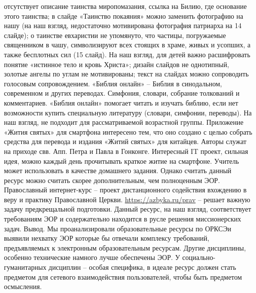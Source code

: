 отсутствует описание таинства миропомазания, ссылка на Билию, где основание этого таинства;
в слайде «Таинство покаяния» можно заменить фотографию на нашу (на наш взгляд, недостаточно мотивирована фотография патриарха на 14 слайде);
о таинстве евхаристии не упомянуто, что частицы, погружаемые священником в чашу, символизируют всех стоящих в храме, живых и усопших, а также бесплотных сил (15 слайд). На наш взгляд, для детей важно расшифровать понятие «истинное тело и кровь Христа»;
дизайн слайдов не однотипный, золотые ангелы по углам не мотивированы;
текст на слайдах можно сопроводить голосовым сопровождением.
«Библия онлайн» – Библия в синодальном, современном и других переводах. Симфония, словари, собрание толкований и комментариев. «Библия онлайн» помогает читать и изучать библию, если нет возможности купить специальную литературу (словари, симфонии, переводы). На наш взгляд, не подходит для рассматриваемой возрастной группы.
Приложение «Жития святых» для смартфона интересено тем, что оно создано с целью собрать средства для перевода и издания «Житий святых» для китайцев. Авторы служат на приходе свв. Апп. Петра и Павла в Гонконге. Интересный IT проект, сильная идея, можно каждый день прочитывать краткое житие на смартфоне. Учитель может использовать в качестве домашнего задания. Однако считать данный ресурс можно считать скорее дополнительным, чем полноценным ЭОР.
Православный интернет-курс – проект дистанционного содействия вхождению в веру и практику Православной Церкви. \url{https://azbyka.ru/prav} – решает важную задачу предкрещальной подготовки. Данный ресурс, на наш взгляд, соответствует требованиям ЭОР и содержательно находится в русле решения миссионерских задач.
Вывод. Мы проанализировали образовательные ресурсы по ОРКСЭи выявили нехватку ЭОР которые бы отвечали комплексу требований, предъявляемых к электронным образовательным ресурсам. Другие дисциплины, особенно технические намного лучше обеспечены ЭОР. У социально-гуманитарных дисциплин – особая специфика, в идеале ресурс должен стать предметом для сетевого взаимодействия пользователей, чтобы быть предметом осмысления.

